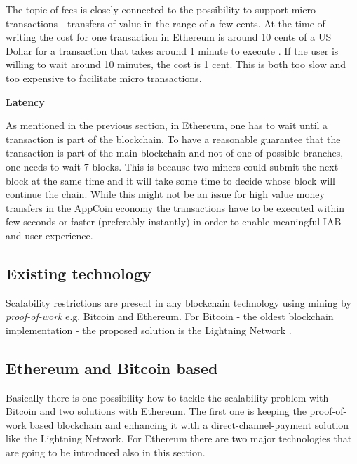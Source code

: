 The topic of fees is closely connected to the possibility to support micro transactions - transfers of value in the range of a few cents. At the time of writing the cost for one transaction in Ethereum is around 10 cents of a US Dollar for a transaction that takes around 1 minute to execute \cite{ethgasstation}. If the user is willing to wait around 10 minutes, the cost is 1 cent. This is both too slow and too expensive to facilitate micro transactions.

\medskip

{\bf Latency}

As mentioned in the previous section, in Ethereum, one has to wait until a transaction is part of the blockchain. To have a reasonable guarantee that the transaction is part of the main blockchain and not of one of possible branches, one needs to wait 7 blocks. This is because two miners could submit the next block at the same time and it will take some time to decide whose block will continue the chain. While this might not be an issue for high value money transfers in the AppCoin economy the transactions have to be executed within few seconds or faster (preferably instantly) in order to enable meaningful IAB and user experience.

\subsection{Existing technology}

Scalability restrictions are present in any blockchain technology using mining by \textit{proof-of-work} e.g. Bitcoin and Ethereum. For Bitcoin - the oldest blockchain implementation - the proposed solution is the Lightning Network \cite{LighthingNetwork}.


\subsection{Ethereum and Bitcoin based}

Basically there is one possibility how to tackle the scalability problem with Bitcoin and two solutions with Ethereum. The first one is keeping the proof-of-work based blockchain and enhancing it with a direct-channel-payment solution like the Lightning Network. For Ethereum there are two major technologies that are going to be introduced also in this section.

